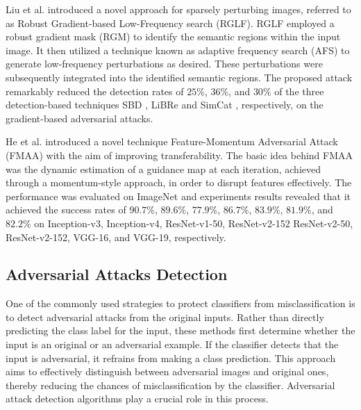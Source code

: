 \documentclass[sn-mathphys]{sn-jnl}%
\theoremstyle{thmstyleone}%
\theoremstyle{thmstyletwo}%
\theoremstyle{thmstylethree}%
\begin{document}
 Liu et al. \cite{Liu2023} introduced a novel approach for sparsely perturbing images, referred to as Robust Gradient-based Low-Frequency search (RGLF). RGLF employed a robust gradient mask (RGM) to identify the semantic regions within the input image. It then utilized a technique known as adaptive frequency search (AFS) to generate low-frequency perturbations as desired. These perturbations were subsequently integrated into the identified semantic regions. The proposed attack  remarkably reduced the detection rates of $25\%$, $36\%$, and $30\%$ of the three detection-based techniques SBD \cite{liu2019sbd}, LiBRe \cite{deng2021libre} and SimCat \cite{moayeri2021}, respectively, on the gradient-based adversarial attacks. 

 He et al. \cite{He2023}  introduced a novel technique Feature-Momentum Adversarial Attack (FMAA) with the aim of improving transferability. The basic idea behind FMAA was the dynamic estimation of a guidance map at each iteration, achieved through a momentum-style approach, in order to disrupt features effectively. The performance was evaluated on ImageNet and experiments results revealed that it achieved the success rates of $90.7\%$, $89.6\%$, $77.9\%$, $86.7\%$, $83.9\%$, $81.9\%$, and $82.2\%$ on Inception-v3, Inception-v4, ResNet-v1-50, ResNet-v2-152 ResNet-v2-50, ResNet-v2-152, VGG-16, and VGG-19, respectively. 
 

\subsection{Adversarial Attacks Detection}
One of the commonly used strategies to protect classifiers from misclassification is to detect adversarial attacks from the original inputs. Rather than directly predicting the class label for the input, these methods first determine whether the input is an original or an adversarial example. If the classifier detects that the input is adversarial, it refrains from making a class prediction. This approach aims to effectively distinguish between adversarial images and original ones, thereby reducing the chances of misclassification by the classifier. Adversarial attack detection algorithms play a crucial role in this process.
\end{document}
